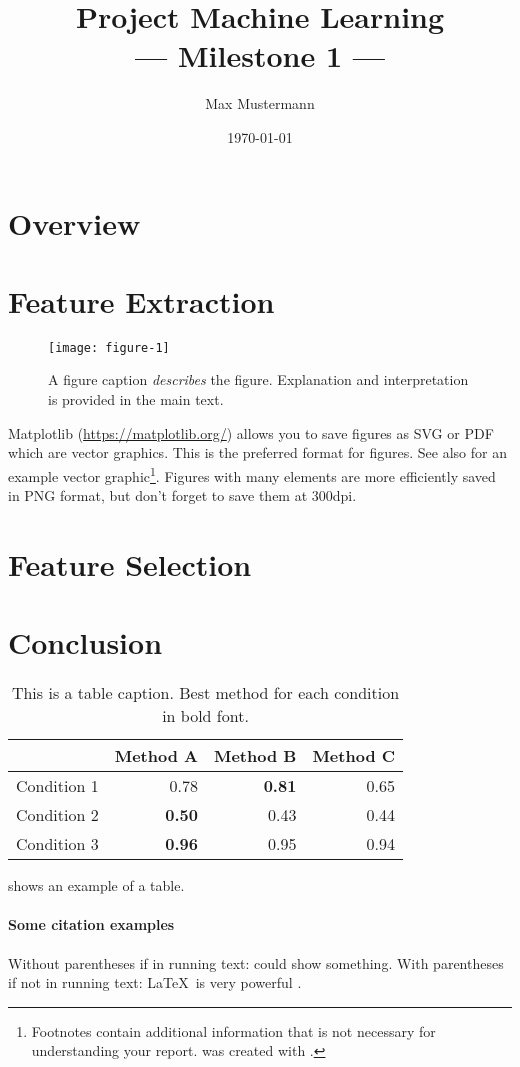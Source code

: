 \documentclass[10pt,a4paper,twoside]{article}
\title{Project Machine Learning\\--- Milestone 1 ---}
\author{Max Mustermann}
\date{\today}
\begin{document}
\maketitle
\section{Overview}
\Blindtext
\section{Feature Extraction}
\begin{figure}
\centering
\texttt{[image: figure-1]}
\caption{A figure caption {\em describes} the figure. Explanation and interpretation is provided in the main text.}\label{fig:exmpl_figure}
\end{figure}
Matplotlib (\url{https://matplotlib.org/}) allows you to save figures as SVG or PDF which are vector graphics. This is the preferred format for figures. See also  for an example vector graphic\footnote{Footnotes contain additional information that is not necessary for understanding your report.  was created with \MP.}. Figures with many elements are more efficiently saved in PNG format, but don't forget to save them at 300dpi.

\blindmathpaper
\section{Feature Selection}
\Blindtext
\section{Conclusion}
\begin{table}
\centering
\begin{tabular}{r|rrr}
& Method A & Method B & Method C \\
\hline
Condition 1 & 0.78 & \textbf{0.81} & 0.65 \\
Condition 2 & \textbf{0.50} & 0.43 & 0.44 \\
Condition 3 & \textbf{0.96} & 0.95 & 0.94
\end{tabular}
\caption{This is a table caption. Best method for each condition in bold font.}\label{tab:methods_vs_conditions}
\end{table}
 shows an example of a table.
\blindtext

\paragraph{Some citation examples}
Without parentheses if in running text: \citet{einstein} could show something. With parentheses if not in running text: \LaTeX\ is very powerful \citep[see][]{latexcompanion,knuthwebsite}.


\end{document}
